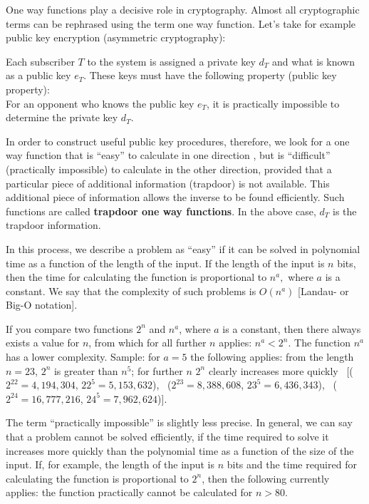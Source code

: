 One way functions play a decisive role in cryptography. Almost all cryptographic 
terms can be rephrased using the term one way function. Let's take for example 
public key encryption  
(asymmetric cryptography):\par

Each subscriber $ T $ to the system is assigned a private  
 key $ d_T $   and what is known as a public key $ e_T $. 
These keys must have the following property (public key property):\\
For an opponent who knows the public key $ e_T $, it is practically impossible 
to determine the private key  $ d_T $.\par

In order to construct useful public key procedures, therefore, we look for a 
one way function that is ``easy'' to calculate in one direction {}, but 
is ``difficult'' (practically impossible) to calculate in the other 
direction, provided that a particular piece of additional information 
 (trapdoor) is not available. This 
additional piece of information allows the inverse to be found efficiently. Such 
functions are called {\bf trapdoor one way functions}. In the above case, $ d_T 
$ is the trapdoor information. \par

In this process, we describe a problem as ``easy'' if it can be solved in 
 polynomial time as a function of the length of the 
input. If the length of the input is $ n $ bits, then the time for calculating 
the function is proportional to $ n^{a}, $ where $ a $  is a constant. We say 
that the  complexity of such problems is $ O(n^{a}) $
[Landau- or Big-O notation]. 

If you compare two functions  $ 2^n $  and   $ n^{a} $,  where $ a $  is a
constant, then there always exists a value for  $ n $,  from which for all
further  $ n $  applies: $ n^{a}  <  2^n $. 
The function  $ n^{a} $  has a lower complexity.    
Sample: for $ a=5 $ the following applies: from the length $ n=23 $, $ 2^n$
is greater than $n^5 $; for further $ n $  $ 2^n $ clearly increases more
quickly \
[($ 2^{22}= 4,194,304 $, $ 22^5= 5,153,632 $), \
 ($ 2^{23}= 8,388,608 $, $ 23^5= 6,436,343 $), \
 ($ 2^{24}=16,777,216 $, $ 24^5= 7,962,624 $)].\par 

The term ``practically impossible'' is slightly less precise. In 
general, we can say that a problem cannot be solved  
efficiently, if the time required to solve it increases more quickly than the 
polynomial\index{Polynomial} time as a function of the size of the input. If, for example, the 
length of the input is $ n $  bits and the time required for calculating the 
function is proportional to $ 2^n $, then the following currently applies: the 
function practically cannot be calculated for $n > 80$.

